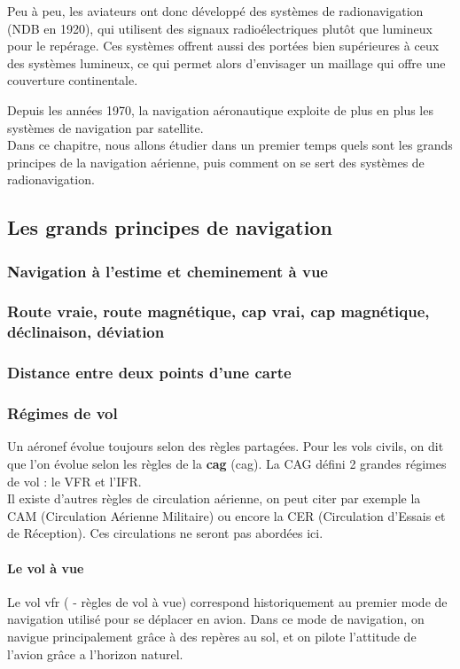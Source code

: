 	Peu à peu, les aviateurs ont donc développé des systèmes de radionavigation (NDB en 1920), qui utilisent des signaux radioélectriques plutôt que lumineux pour le repérage. Ces systèmes offrent aussi des portées bien supérieures à ceux des systèmes lumineux, ce qui permet alors d'envisager un maillage qui offre une couverture continentale.
	
	Depuis les années 1970, la navigation aéronautique exploite de plus en plus les systèmes de navigation par satellite.\\
	
	Dans ce chapitre, nous allons étudier dans un premier temps quels sont les grands principes de la navigation aérienne, puis comment on se sert des systèmes de radionavigation.
	
	\subsection{Les grands principes de navigation}
		\subsubsection{Navigation à l'estime et cheminement à vue}
		\subsubsection{Route vraie, route magnétique, cap vrai, cap magnétique, déclinaison, déviation}
		\subsubsection{Distance entre deux points d'une carte}
		\subsubsection{Régimes de vol}
		Un aéronef évolue toujours selon des règles partagées. Pour les vols civils, on dit que l'on évolue selon les règles de la \textbf{\acrlong{cag}}	(\acrshort{cag}). La CAG défini 2 grandes régimes de vol : le VFR et l'IFR.\\
		
		Il existe d'autres règles de circulation aérienne, on peut citer par exemple la CAM (Circulation Aérienne Militaire) ou encore la CER (Circulation d'Essais et de Réception). Ces circulations ne seront pas abordées ici.
		
		\paragraph{Le vol à vue}
		Le vol \acrshort{vfr} ( - règles de vol à vue) correspond historiquement au premier mode de navigation utilisé pour se déplacer en avion. Dans ce mode de navigation, on navigue principalement grâce à des repères au sol, et on pilote l'attitude de l'avion grâce a l'horizon naturel. 
		
